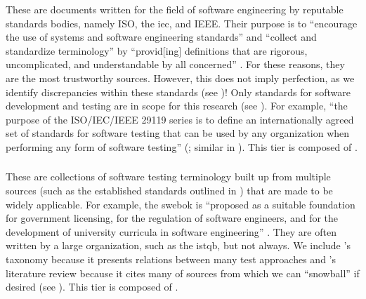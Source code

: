These are documents written for the field of software engineering by reputable
standards bodies, namely ISO, the \acf{iec}, and IEEE. Their purpose is to
``encourage the use of systems and software engineering standards'' and
``collect and standardize terminology'' by ``provid[ing] definitions that are
rigorous, uncomplicated, and understandable by all concerned''
\citep[p.~viii]{IEEE2017}. For these reasons, they
are the most trustworthy sources. However, this does not imply perfection, as we
identify  %
discrepancies within these standards (see )!
Only standards for software development and testing are in scope for
this research (see ). For example, ``the purpose of the
ISO/IEC/IEEE 29119 series is to define an internationally agreed set of
standards for software testing that can be used by any organization when
performing any form of software testing''
\ifnotpaper(\fi\citeyear[p.~vii]{IEEE2022}\ifnotpaper; similar in
\citeyear[p.~ix]{IEEE2016})\fi.
This tier is composed of .

\subsubsection{}
\label{metas}

These are collections of software testing terminology built up from multiple
sources (such as the established standards outlined in ) that are
made to be widely applicable. For example, the \acs{swebok} is ``proposed as a
suitable foundation for government licensing, for the regulation of software
engineers, and for the development of university curricula in software
engineering'' \citep[p.~xix]{KanerEtAl2011}. They are often written by a large
organization, such as the \acf{istqb}, but not always. We include
\citeauthor{Firesmith2015}'s taxonomy
\citeyearpar{Firesmith2015} because it presents relations between many test
approaches and \citeauthor{DoğanEtAl2014}'s
literature review \citeyearpar{DoğanEtAl2014} because it cites many
of sources from which we can ``snowball'' if desired (see ).
This tier is composed of .

\subsubsection{}
\label{texts}

